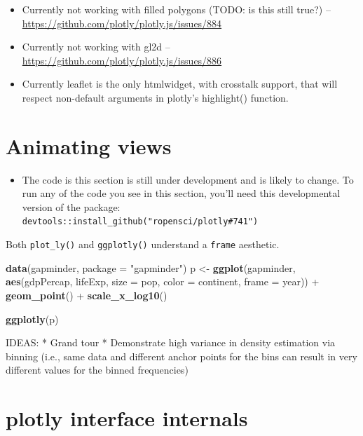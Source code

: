 \documentclass[12pt,]{isuthesis}
\newenvironment{Shaded}{\begin{snugshade}}{\end{snugshade}}
\newcommand{\KeywordTok}[1]{\textcolor[rgb]{0.13,0.29,0.53}{\textbf{{#1}}}}
\newcommand{\DataTypeTok}[1]{\textcolor[rgb]{0.13,0.29,0.53}{{#1}}}
\newcommand{\StringTok}[1]{\textcolor[rgb]{0.31,0.60,0.02}{{#1}}}
\newcommand{\NormalTok}[1]{{#1}}
\newenvironment{rmdblock}[1]
  {\begin{shaded*}
  \begin{itemize}
  \renewcommand{\labelitemi}{
    \raisebox{-.7\height}[0pt][0pt]{
      {\setkeys{Gin}{width=3em,keepaspectratio}\texttt{[image: images/\#1]}}
    }
  }
  \item
  }
  {
  \end{itemize}
  \end{shaded*}
  }
\newenvironment{rmdwarning}
  {\begin{rmdblock}{warning}}
  {\end{rmdblock}}
\providecommand{\tightlist}{%
  \setlength{\itemsep}{0pt}\setlength{\parskip}{0pt}}
\begin{document}
\begin{itemize}
\tightlist
\item
  Currently not working with filled polygons (TODO: is this still true?)
  -- \url{https://github.com/plotly/plotly.js/issues/884}
\item
  Currently not working with gl2d --
  \url{https://github.com/plotly/plotly.js/issues/886}
\item
  Currently leaflet is the only htmlwidget, with crosstalk support, that
  will respect non-default arguments in plotly's highlight() function.
\end{itemize}

\hypertarget{animating-views}{\section{Animating
views}\label{animating-views}}

\begin{rmdwarning}
The code is this section is still under development and is likely to
change. To run any of the code you see in this section, you'll need this
developmental version of the package:
\texttt{devtools::install\_github("ropensci/plotly\#741")}
\end{rmdwarning}

Both \texttt{plot\_ly()} and \texttt{ggplotly()} understand a
\texttt{frame} aesthetic.

\begin{Shaded}
\begin{Highlighting}[]
\KeywordTok{data}\NormalTok{(gapminder, }\DataTypeTok{package =} \StringTok{"gapminder"}\NormalTok{)}
\NormalTok{p <-}\StringTok{ }\KeywordTok{ggplot}\NormalTok{(gapminder, }\KeywordTok{aes}\NormalTok{(gdpPercap, lifeExp, }\DataTypeTok{size =} \NormalTok{pop, }
                           \DataTypeTok{color =} \NormalTok{continent, }\DataTypeTok{frame =} \NormalTok{year)) +}
\StringTok{  }\KeywordTok{geom_point}\NormalTok{() +}
\StringTok{  }\KeywordTok{scale_x_log10}\NormalTok{()}

\KeywordTok{ggplotly}\NormalTok{(p)}
\end{Highlighting}
\end{Shaded}

IDEAS: * Grand tour * Demonstrate high variance in density estimation
via binning (i.e., same data and different anchor points for the bins
can result in very different values for the binned frequencies)

\section{plotly interface internals}\label{plotly-interface-internals}
\end{document}
